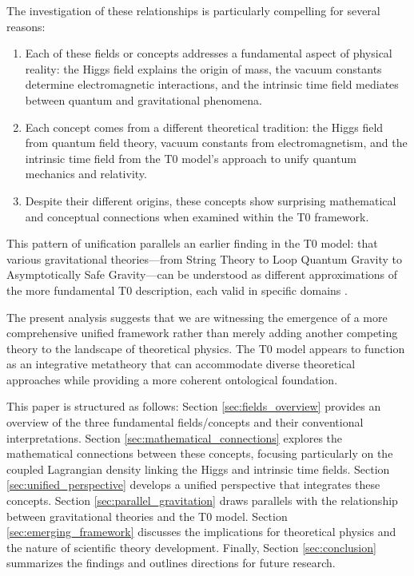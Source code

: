 \documentclass[12pt,a4paper]{article}
\begin{document}
	The investigation of these relationships is particularly compelling for several reasons:
	
	\begin{enumerate}
		\item Each of these fields or concepts addresses a fundamental aspect of physical reality: the Higgs field explains the origin of mass, the vacuum constants determine electromagnetic interactions, and the intrinsic time field mediates between quantum and gravitational phenomena.
		
		\item Each concept comes from a different theoretical tradition: the Higgs field from quantum field theory, vacuum constants from electromagnetism, and the intrinsic time field from the T0 model's approach to unify quantum mechanics and relativity.
		
		\item Despite their different origins, these concepts show surprising mathematical and conceptual connections when examined within the T0 framework.
	\end{enumerate}
	
	This pattern of unification parallels an earlier finding in the T0 model: that various gravitational theories—from String Theory to Loop Quantum Gravity to Asymptotically Safe Gravity—can be understood as different approximations of the more fundamental T0 description, each valid in specific domains \cite{pascher_completetheory_2025}.
	
	The present analysis suggests that we are witnessing the emergence of a more comprehensive unified framework rather than merely adding another competing theory to the landscape of theoretical physics. The T0 model appears to function as an integrative metatheory that can accommodate diverse theoretical approaches while providing a more coherent ontological foundation.
	
	This paper is structured as follows: Section \ref{sec:fields_overview} provides an overview of the three fundamental fields/concepts and their conventional interpretations. Section \ref{sec:mathematical_connections} explores the mathematical connections between these concepts, focusing particularly on the coupled Lagrangian density linking the Higgs and intrinsic time fields. Section \ref{sec:unified_perspective} develops a unified perspective that integrates these concepts. Section \ref{sec:parallel_gravitation} draws parallels with the relationship between gravitational theories and the T0 model. Section \ref{sec:emerging_framework} discusses the implications for theoretical physics and the nature of scientific theory development. Finally, Section \ref{sec:conclusion} summarizes the findings and outlines directions for future research.
	
\end{document}
